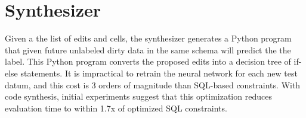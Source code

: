 \section{Synthesizer}
Given a the list of edits and cells, the synthesizer generates a Python program that given future unlabeled dirty data in the same schema will predict the the label. This Python program converts the proposed edits into a decision tree of if-else statements. It is impractical to retrain the neural network for each new test datum, and this cost is 3 orders of magnitude than SQL-based constraints. With code synthesis, initial experiments suggest that this optimization reduces evaluation time to within 1.7x of optimized SQL constraints. 
